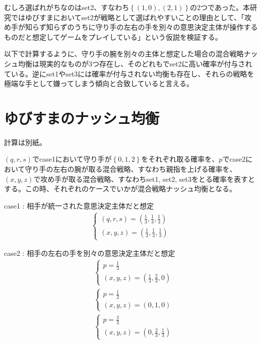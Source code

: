 \documentclass{jsarticle}
\begin{document}
むしろ選ばれがちなのはset2、すなわち$\left\{ (1,0), (2,1)\right\}$の2つであった。本研究ではゆびすまにおいてset2が戦略として選ばれやすいことの理由として、「攻め手が知らず知らずのうちに守り手の左右の手を別々の意思決定主体が操作するものだと想定してゲームをプレイしている」という仮説を検証する。

以下で計算するように、守り手の腕を別々の主体と想定した場合の混合戦略ナッシュ均衡は現実的なものが3つ存在し、そのどれもでset2に高い確率が付与されている。逆にset1やset3には確率が付与されない均衡も存在し、それらの戦略を極端な手として嫌ってしまう傾向と合致していると言える。

\section{ゆびすまのナッシュ均衡}
計算は別紙。

$(q, r, s)$でcase1において守り手が$\left\{ 0,1,2\right\}$をそれぞれ取る確率を、$p$でcase2において守り手の左右の腕が取る混合戦略、すなわち親指を上げる確率を、$(x, y, z)$で攻め手が取る混合戦略、すなわちset1, set2, set3をとる確率を表すとする。この時、それぞれのケースでいかが混合戦略ナッシュ均衡となる。

\begin{itembox}[l]{case1 : 相手が統一された意思決定主体だと想定}
    \begin{align}
    	\begin{cases}
		(q, r, s) = (\frac{1}{3}, \frac{1}{3}, \frac{1}{3})\\
		(x, y, z) = (\frac{1}{3}, \frac{1}{3}, \frac{1}{3})
	\end{cases}
    \end{align}
\end{itembox}

\begin{itembox}[l]{case2 : 相手の左右の手を別々の意思決定主体だと想定}
\begin{align}
    	&\begin{cases}
		p = \frac{1}{3}\\
		(x, y, z) = (\frac{1}{3}, \frac{2}{3}, 0)
	\end{cases}\\[10pt]
	&\begin{cases}
		p = \frac{1}{2}\\
		(x, y, z) = (0, 1, 0)
	\end{cases}\\[10pt]
	&\begin{cases}
		p = \frac{2}{3}\\
		(x, y, z) = (0, \frac{2}{3}, \frac{1}{3})
	\end{cases}
\end{align}
\end{itembox}
\end{document}
